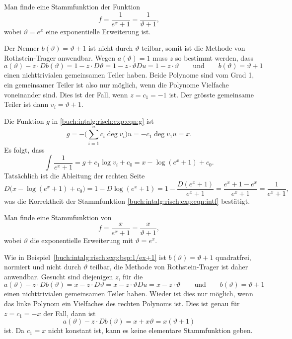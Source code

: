 \begin{beispiel}
\label{buch:intalg:risch:exp:bsp:1/ex+1}
Man finde eine Stammfunktion der Funktion
\[
f
=
\frac{1}{e^x+1}
=
\frac{1}{\vartheta + 1},
\]
wobei $\vartheta=e^x$ eine exponentielle Erweiterung ist.
\medskip

\noindent
Der Nenner $b(\vartheta) = \vartheta+1$ ist nicht durch $\vartheta$ teilbar,
somit ist die Methode von Rothstein-Trager anwendbar.
Wegen $a(\vartheta)=1$ muss $z$ so bestimmt werden, dass
\[
a(\vartheta) - z\cdot Db(\vartheta)
=
1- z \cdot D\vartheta
=
1- z\cdot \vartheta Du
=
1-z\cdot \vartheta 
\qquad\text{und}\qquad
b(\vartheta) = \vartheta+1
\]
einen nichttrivialen gemeinsamen Teiler haben.
Beide Polynome sind vom Grad 1, ein gemeinsamer Teiler ist also nur
möglich, wenn die Polynome Vielfache voneinander sind.
Dies ist der Fall, wenn $z=c_1=-1$ ist.
Der grösste gemeinsame Teiler ist dann $v_i=\vartheta+1$.

Die Funktion $g$ in \eqref{buch:intalg:risch:exp:eqn:g}
ist
\[
g
=
-\biggl(\sum_{i=1}^n c_i\deg v_i \biggr) u
=
- c_1 \deg v_1 u
=
x.
\]
Es folgt, dass
\begin{equation}
\int\frac{1}{e^x+1}
=
g+
c_1\log v_i
+
c_0
=
x
-\log (e^x+1)
+
c_0.
\label{buch:intalg:risch:exp:eqn:intf}
\end{equation}
Tatsächlich ist die Ableitung der rechten Seite
\[
D
\bigl(
x
-\log (e^x+1)
+
c_0
\bigr)
=
1
-D\log(e^x+1)
=
1
-\frac{D(e^x+1)}{e^x+1}
=
\frac{e^x+1-e^x}{e^x+1}
=
\frac{1}{e^x+1},
\]
was die Korrektheit der Stammfunktion
\eqref{buch:intalg:risch:exp:eqn:intf}
bestätigt.
\end{beispiel}

\begin{beispiel}
\label{buch:intalg:risch:exp:bsp:x/ex+1}
Man finde eine Stammfunktion von 
\begin{equation}
f = \frac{x}{e^x+1} = \frac{x}{\vartheta+1},
\label{buch:intalg:risch:exp:eqn:x/ex+1}
\end{equation}
wobei $\vartheta$ die exponentielle Erweiterung mit $\vartheta=e^x$.
\medskip

\noindent
Wie in Beispiel~\ref{buch:intalg:risch:exp:bsp:1/ex+1} ist
$b(\vartheta)=\vartheta+1$ quadratfrei, normiert und nicht durch $\vartheta$
teilbar, die Methode von Rothstein-Trager ist daher anwendbar.
Gesucht sind diejenigen $z$, für die
\[
a(\vartheta) - z\cdot Db(\vartheta)
=
x- z \cdot D\vartheta
=
x- z\cdot \vartheta Du
=
x-z\cdot \vartheta 
\qquad\text{und}\qquad
b(\vartheta) = \vartheta+1
\]
einen nichttrivialen gemeinsamen Teiler haben.
Wieder ist dies nur möglich, wenn das linke Polynom ein Vielfaches
des rechten Polynoms ist.
Dies ist genau für $z=c_1=-x$ der Fall, dann ist
\[
a(\vartheta) - z\cdot Db(\vartheta)
=
x+x \vartheta 
=
x(\vartheta+1)
\]
ist.
Da $c_1=x$ nicht konstant ist, kann es keine elementare Stammfunktion
geben.
\end{beispiel}

